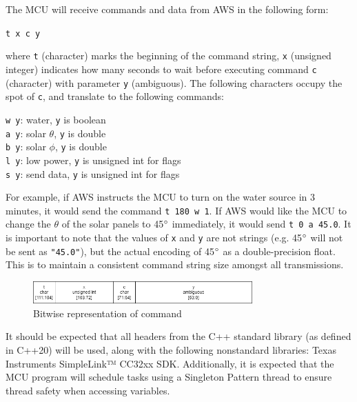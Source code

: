\begin{flushleft}
    The MCU will receive commands and data from AWS in the following form:
    \begin{center}
        \texttt{t x c y}
    \end{center}
    where \texttt{t} (character) marks the beginning of the command string,
    \texttt{x} (unsigned integer) indicates how many seconds to wait before
    executing command \texttt{c} (character) with parameter \texttt{y}
    (ambiguous). The following characters occupy the spot of \texttt{c}, and
    translate to the following commands:
    \begin{center}
        \texttt{w y}: water, \texttt{y} is boolean \\
        \texttt{a y}: solar $\theta$, \texttt{y} is double \\
        \texttt{b y}: solar $\phi$, \texttt{y} is double \\
        \texttt{l y}: low power, \texttt{y} is unsigned int for flags \\
        \texttt{s y}: send data, \texttt{y} is unsigned int for flags
    \end{center}
    For example, if AWS instructs the MCU to turn on the water source in 3
    minutes, it would send the command \texttt{t 180 w 1}. If AWS would like
    the MCU to change the $\theta$ of the solar panels to 45$\degree$
    immediately, it would send \texttt{t 0 a 45.0}. It is important to note
    that the values of \texttt{x} and \texttt{y} are not strings (e.g.
    45$\degree$ will not be sent as \texttt{"45.0"}), but the actual encoding
    of 45$\degree$ as a double-precision float. This is to maintain a
    consistent command string size amongst all transmissions.
    \begin{figure}[H]
        \caption{Bitwise representation of command}
        \label{command_bitwise}
        \centering
        \includegraphics[width=0.75\textwidth]{images/command_encoding.png}
    \end{figure}
\end{flushleft}
\begin{flushleft}
    It should be expected that all headers from the C++ standard library (as
    defined in C++20) will be used, along with the following nonstandard
    libraries: Texas Instruments SimpleLink™ CC32xx SDK. Additionally, it is
    expected that the MCU program will schedule tasks using a Singleton Pattern
    thread to ensure thread safety when accessing variables.
\end{flushleft}

